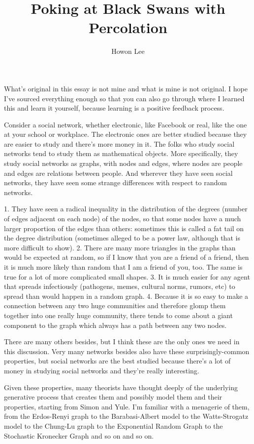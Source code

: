 \documentclass[12pt]{article}
\begin{document}
\title{Poking at Black Swans with Percolation}
\author{Howon Lee}
\maketitle

What's original in this essay is not mine and what is mine is not original. I hope I've sourced everything enough so that you can also go through where I learned this and learn it yourself, because learning is a positive feedback process.

Consider a social network, whether electronic, like Facebook or real, like the one at your school or workplace. The electronic ones are better studied because they are easier to study and there's more money in it. The folks who study social networks tend to study them as mathematical objects. More specifically, they study social networks as graphs, with nodes and edges, where nodes are people and edges are relations between people. And wherever they have seen social networks, they have seen some strange differences with respect to random networks.

1. They have seen a radical inequality in the distribution of the degrees (number of edges adjacent on each node) of the nodes, so that some nodes have a much larger proportion of the edges than others: sometimes this is called a fat tail on the degree distribution (sometimes alleged to be a power law, although that is more difficult to show).
2. There are many more triangles in the graphs than would be expected at random, so if I know that you are a friend of a friend, then it is much more likely than random that I am a friend of you, too. The same is true for a lot of more complicated small shapes.
3. It is much easier for any agent that spreads infectiously (pathogens, memes, cultural norms, rumors, etc) to spread than would happen in a random graph.
4. Because it is so easy to make a connection between any two huge communities and therefore glomp them together into one really huge community, there tends to come about a giant component to the graph which always has a path between any two nodes.

There are many others besides, but I think these are the only ones we need in this discussion. Very many networks besides also have these surprisingly-common properties, but social networks are the best studied because there's a lot of money in studying social networks and they're really interesting.

Given these properties, many theorists have thought deeply of the underlying generative process that creates them and possibly model them and their properties, starting from Simon and Yule. I'm familiar with a menagerie of them, from the Erdos-Renyi graph to the Barabasi-Albert model to the Watts-Strogatz model to the Chung-Lu graph to the Exponential Random Graph to the Stochastic Kronecker Graph and so on and so on.
\end{document}
